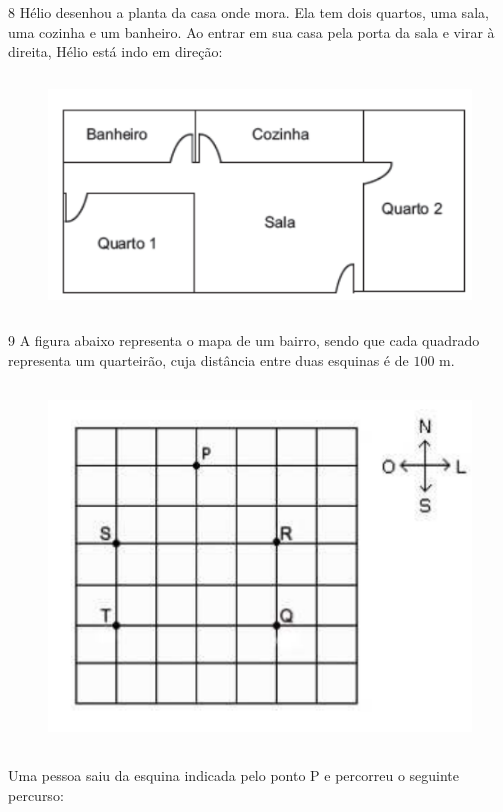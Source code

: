 
\num{8}  Hélio desenhou a planta da casa onde mora. Ela tem dois quartos, uma
sala, uma cozinha e um banheiro. Ao entrar em sua casa pela porta da sala e virar à direita, Hélio está
indo em direção:

\begin{figure}
\includegraphics[width=4.94792in,height=2.46875in]{./imgSAEB_6_MAT/media/image71.png}
\end{figure}


\num{9}  A figura abaixo representa o mapa de um bairro, sendo que cada
quadrado representa um quarteirão, cuja distância entre duas esquinas é
de $100$ m.

\begin{figure}
\includegraphics[width=4.82569in,height=3.77917in]{./imgSAEB_6_MAT/media/image72.png}
\end{figure}

Uma pessoa saiu da esquina indicada pelo ponto P e percorreu o seguinte
percurso:

